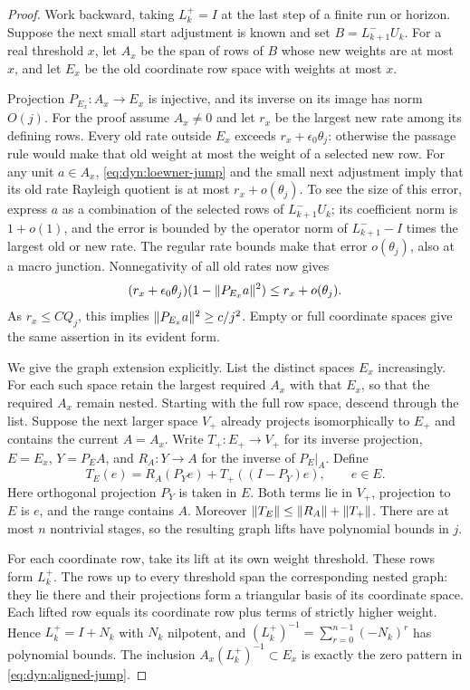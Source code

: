 \begin{proof}
Work backward, taking $L_k^+=I$ at the last step of a finite run or
horizon.  Suppose the next small start adjustment is known and set
$B=L_{k+1}^-U_k$.  For a real threshold $x$, let $A_x$ be the span of
rows of $B$ whose new weights are at most $x$, and let $E_x$ be the old
coordinate row space with weights at most $x$.

Projection $P_{E_x}:A_x\to E_x$ is injective, and its inverse on its
image has norm $O(j)$.  For the proof assume $A_x\ne0$ and let $r_x$
be the largest new rate among its defining rows.  Every old rate
outside $E_x$ exceeds $r_x+\epsilon_0\theta_j$: otherwise the passage
rule would make that old weight at most the weight of a selected new
row.  For any unit $a\in A_x$, \eqref{eq:dyn:loewner-jump} and the
small next adjustment imply that its old rate Rayleigh quotient is at
most $r_x+o(\theta_j)$.  To see the size of this error, express $a$ as
a combination of the selected rows of $L_{k+1}^-U_k$; its coefficient
norm is $1+o(1)$, and the error is bounded by the operator norm of
$L_{k+1}^- -I$ times the largest old or new rate.  The regular rate
bounds make that error $o(\theta_j)$, also at a macro junction.
Nonnegativity of all old rates now gives
\[
 (r_x+\epsilon_0\theta_j)
       (1-\lVert P_{E_x}a\rVert^2)
 \le r_x+o(\theta_j).
\]
As $r_x\le C Q_j$, this implies
$\lVert P_{E_x}a\rVert^2\ge c/j^2$.  Empty or full coordinate spaces give
the same assertion in its evident form.

We give the graph extension explicitly.  List the distinct spaces
$E_x$ increasingly.  For each such space retain the largest required
$A_x$ with that $E_x$, so that the required $A_x$ remain nested.
Starting with the full row space, descend through the list.  Suppose
the next larger space $V_+$ already projects isomorphically to $E_+$
and contains the current $A=A_x$.  Write $T_+:E_+\to V_+$ for its
inverse projection, $E=E_x$, $Y=P_EA$, and $R_A:Y\to A$ for the
inverse of $P_E|_A$.  Define
\begin{equation}
 T_E(e)=R_A(P_Ye)+T_+((I-P_Y)e),\qquad e\in E.
 \label{eq:dyn:graph-extension}
\end{equation}
Here orthogonal projection $P_Y$ is taken in $E$.  Both terms lie in
$V_+$, projection to $E$ is $e$, and the range contains $A$.
Moreover $\lVert T_E\rVert\le\lVert R_A\rVert+\lVert T_+\rVert$.
There are at most $n$ nontrivial stages, so the resulting graph lifts
have polynomial bounds in $j$.

For each coordinate row, take its lift at its own weight threshold.
These rows form $L_k^+$.  The rows up to every threshold span the
corresponding nested graph: they lie there and their projections form
a triangular basis of its coordinate space.  Each lifted row equals
its coordinate row plus terms of strictly higher weight.  Hence
$L_k^+=I+N_k$ with $N_k$ nilpotent, and
$(L_k^+)^{-1}=\sum_{r=0}^{n-1}(-N_k)^r$ has polynomial bounds.
The inclusion $A_x(L_k^+)^{-1}\subset E_x$ is exactly the zero pattern
in \eqref{eq:dyn:aligned-jump}.


\end{proof}
